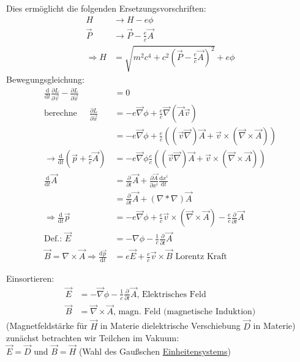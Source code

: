 \documentclass[a4paper]{article}
\begin{document}
Dies ermöglicht die folgenden Ersetzungsvorschriften:
\begin{align}
H &\rightarrow H-e\phi\\
\vec{P} &\rightarrow \vec{P}-\frac{e}{c}\vec{A}\\
\Rightarrow H&=\sqrt{m^2c^4+c^2\left(\vec{P}-\frac{e}{c}\vec{A}\right)^2}+e\phi
\end{align}
Bewegungsgleichung:
\begin{align}
\frac{\mathrm{d}}{\mathrm{d}t}\frac{\partial L}{\partial \vec{v}}-\frac{\partial L}{\partial
\vec{x}}&=0\\
\text{berechne }\ \ \ \ \  \frac{\partial
L}{\partial\vec{x}}&=-e\vec{\nabla}\phi+ \frac{e}{c}\vec{\nabla}(\vec{A}\vec{v})\\
&=-e\vec{\nabla}\phi+\frac{e}{c}\left(
(\vec{v}\vec{\nabla})\vec{A}+\vec{v}\times(\vec{\nabla}\times\vec{A}) \right)\\
\rightarrow \frac{\mathrm{d}}{\mathrm{d}t}(\vec{p}+\frac{e}{c}\vec{A})&=-e\vec{\nabla}\phi
\frac{e}{c}\left( (\vec{v}\vec{\nabla})\vec{A}+\vec{v}\times(\vec{\nabla}\times\vec{A})
\right)\\
\frac{\mathrm{d}}{\mathrm{d}t}\vec{A}&=\frac{\partial}{\partial t}\vec{A}+
\frac{\partial\vec{A}}{\partial x^i}\frac{\mathrm{d}x^i}{\mathrm{d}t}\\
&=\frac{\partial}{\partial t}\vec{A}+(\nabla*\nabla)\vec{A}\\
\Rightarrow
\frac{\mathrm{d}}{\mathrm{d}t}\vec{p}&=-e\vec{\nabla}\phi+\frac{e}{c}\vec{v}
\times(\vec{\nabla}\times\vec{A}) -\frac{e}{c}\frac{\partial}{\partial t}\vec{A}\\
\text{Def.: }\vec{E}&=-\nabla\phi-\frac{1}{c}\frac{\partial}{\partial
t}\vec{A}\\
\vec{B}=\nabla \times \vec{A}
\Rightarrow \frac{\mathrm{d}\vec{p}}{\mathrm{d}t}&=e\vec{E}+\frac{e}{c}\vec{v}\times\vec{B} 
\text{ Lorentz Kraft}
\end{align}

Einsortieren:
\begin{align}
\vec{E}&=-\vec{\nabla}\phi-\frac{1}{c}\frac{\partial}{\partial t}\vec{A}
\text{, Elektrisches Feld}\\
\vec{B}&=\vec{\nabla}\times\vec{A} \text{, magn. Feld (magnetische Induktion)}
\end{align}
(Magnetfeldstärke für $\vec{H}$ in Materie dielektrische Verschiebung $\vec{D}$
in Materie)\\
zunächst betrachten wir Teilchen im Vakuum:\\
$\vec{E}=\vec{D}$ und $\vec{B}=\vec{H}$ (Wahl des Gaußschen
\underline{Einheitensystems})
\end{document}
